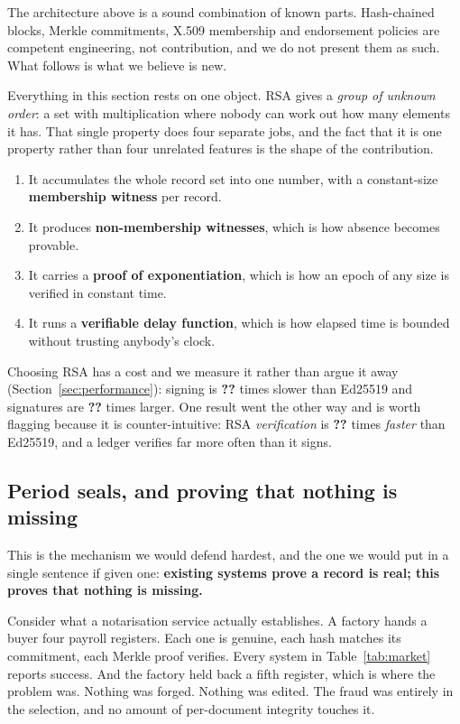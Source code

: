 \documentclass[11pt,a4paper]{article}
\providecommand{\num}[1]{\textbf{??}}%
\begin{document}
The architecture above is a sound combination of known parts. Hash-chained
blocks, Merkle commitments, X.509 membership and endorsement policies are
competent engineering, not contribution, and we do not present them as such.
What follows is what we believe is new.

Everything in this section rests on one object. RSA gives a \emph{group of
unknown order}: a set with multiplication where nobody can work out how many
elements it has. That single property does four separate jobs, and the fact that
it is one property rather than four unrelated features is the shape of the
contribution.

\begin{enumerate}[leftmargin=1.5em,itemsep=0.2em]
\item It accumulates the whole record set into one number, with a constant-size
      \textbf{membership witness} per record.
\item It produces \textbf{non-membership witnesses}, which is how absence becomes
      provable.
\item It carries a \textbf{proof of exponentiation}, which is how an epoch of any
      size is verified in constant time.
\item It runs a \textbf{verifiable delay function}, which is how elapsed time is
      bounded without trusting anybody's clock.
\end{enumerate}

Choosing RSA has a cost and we measure it rather than argue it away
(Section~\ref{sec:performance}): signing is
\num{IdentityRsaSignSlowdown} times slower than Ed25519 and signatures are
\num{IdentityRsaSignatureGrowth} times larger. One result went the other way and
is worth flagging because it is counter-intuitive: RSA \emph{verification} is
\num{IdentityRsaVerifySpeedup} times \emph{faster} than Ed25519, and a ledger
verifies far more often than it signs.

\subsection{Period seals, and proving that nothing is missing}
\label{sec:seals}

This is the mechanism we would defend hardest, and the one we would put in a
single sentence if given one: \textbf{existing systems prove a record is real;
this proves that nothing is missing.}

Consider what a notarisation service actually establishes. A factory hands a
buyer four payroll registers. Each one is genuine, each hash matches its
commitment, each Merkle proof verifies. Every system in Table~\ref{tab:market}
reports success. And the factory held back a fifth register, which is where the
problem was. Nothing was forged. Nothing was edited. The fraud was entirely in
the selection, and no amount of per-document integrity touches it.
\end{document}

